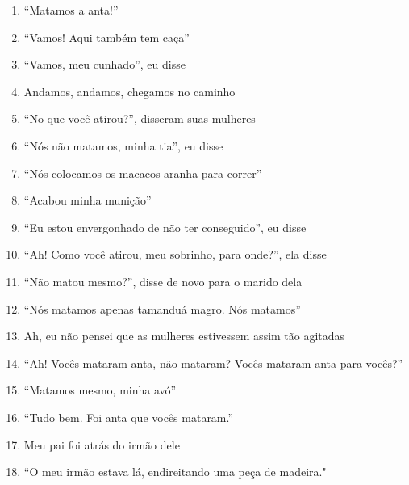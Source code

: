 \begin{enumerate}
 \item ``Matamos a anta!''

 \item ``Vamos! Aqui também tem caça''

 \item ``Vamos, meu cunhado'', eu disse

 \begin{center}\end{center}

 \item Andamos, andamos, chegamos no caminho

 \item ``No que você atirou?'', disseram suas mulheres

 \item ``Nós não matamos, minha tia'', eu disse

 \item ``Nós colocamos os macacos-aranha para correr''

 \item ``Acabou minha munição''

 \item ``Eu estou envergonhado de não ter conseguido'', eu disse

 \item ``Ah! Como você atirou, meu sobrinho, para onde?'', ela disse

 \item ``Não matou mesmo?'', disse de novo para o marido dela

 \item ``Nós matamos apenas tamanduá magro. Nós matamos''

 \begin{center}\end{center}

 \item Ah, eu não pensei que as mulheres estivessem assim tão agitadas

 \item ``Ah! Vocês mataram anta, não mataram? Vocês mataram anta para vocês?''

 \item ``Matamos mesmo, minha avó''

 \item ``Tudo bem. Foi anta que vocês mataram.''

 \item Meu pai foi atrás do irmão dele

 \item ``O meu irmão estava lá, endireitando uma peça de madeira."


\end{enumerate}

